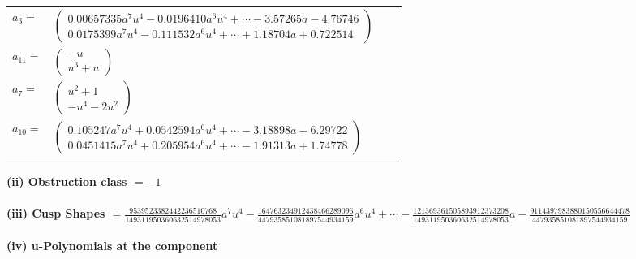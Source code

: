 \documentclass[1p]{elsarticle_modified}
\theoremstyle{definition}
\begin{document}
\begin{tabular}{m{7pt} m{180pt} m{7pt} m{180pt} }
\flushright $a_{3}=$&$\begin{pmatrix}0.00657335 a^{7} u^{4}-0.0196410 a^{6} u^{4}+\cdots-3.57265 a-4.76746\\0.0175399 a^{7} u^{4}-0.111532 a^{6} u^{4}+\cdots+1.18704 a+0.722514\end{pmatrix}$ \\
\flushright $a_{11}=$&$\begin{pmatrix}- u\\u^3+u\end{pmatrix}$ \\
\flushright $a_{7}=$&$\begin{pmatrix}u^2+1\\- u^4-2 u^2\end{pmatrix}$ \\
\flushright $a_{10}=$&$\begin{pmatrix}0.105247 a^{7} u^{4}+0.0542594 a^{6} u^{4}+\cdots-3.18898 a-6.29722\\0.0451415 a^{7} u^{4}+0.205954 a^{6} u^{4}+\cdots-1.91313 a+1.74778\end{pmatrix}$\\&\end{tabular}
\flushleft \textbf{(ii) Obstruction class $= -1$}\\~\\
\flushleft \textbf{(iii) Cusp Shapes $= \frac{9539523382442236510768}{149311950360632514978053} a^7 u^4-\frac{164763234912438466289096}{447935851081897544934159} a^6 u^4+\cdots-\frac{121369361505893912373208}{149311950360632514978053} a-\frac{9114397983880150556644478}{447935851081897544934159}$}\\~\\
\newpage\renewcommand{\arraystretch}{1}
\flushleft \textbf{(iv) u-Polynomials at the component}\newline \\
\end{document}
